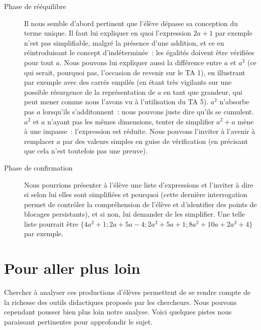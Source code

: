\documentclass{report}
\theoremstyle{definition}
\begin{document}
\begin{description}
\item[Phase de rééquilibre] Il nous semble d'abord pertinent que l'élève dépasse sa conception du terme unique. Il faut lui expliquer en quoi l'expression $2a+1$ par exemple n'est pas simplifiable, malgré la présence d'une addition, et ce en réintroduisant le concept d'indéterminée~: les égalités doivent être vérifiées pour tout $a$. Nous pouvons lui expliquer aussi la différence entre $a$ et $a^2$ (ce qui serait, pourquoi pas, l'occasion de revenir sur le TA 1), en illustrant par exemple avec des carrés empilés (en étant très vigilants sur une possible résurgence de la représentation de $a$ en tant que grandeur, qui peut mener comme nous l'avons vu à l'utilisation du TA 5). $a^2$ n'absorbe pas $a$ lorsqu'ils s'additonnent~: nous pouvons juste dire qu'ils se cumulent. $a^2$ et $a$ n'ayant pas les mêmes dimensions, tenter de simplifier $a^2+a$ mène à une impasse~: l'expression est réduite. Nous pouvons l'inviter à l'avenir à remplacer $a$ par des valeurs simples en guise de vérification (en précisant que cela n'est toutefois pas une preuve).
\item[Phase de confirmation] Nous pourrions présenter à l'élève une liste d'expressions et l'inviter à dire si selon lui elles sont simplifiées et pourquoi (cette dernière interrogation permet de contrôler la compréhension de l'élève et d'identifier des points de blocages persistants), et si non, lui demander de les simplifier. Une telle liste pourrait être $\{4a^2+1; 2a+5a-4; 2a^2+5a+1;8a^2+10a+2a^2+4\}$ par exemple.
\end{description}

\section*{Pour aller plus loin}

Chercher à analyser ces productions d'élèves permettent de se rendre compte de la richesse des outils didactiques proposés par les chercheurs. Nous pouvons cependant pousser bien plus loin notre analyse. Voici quelques pistes nous paraissant pertinentes pour approfondir le sujet.
\end{document}

